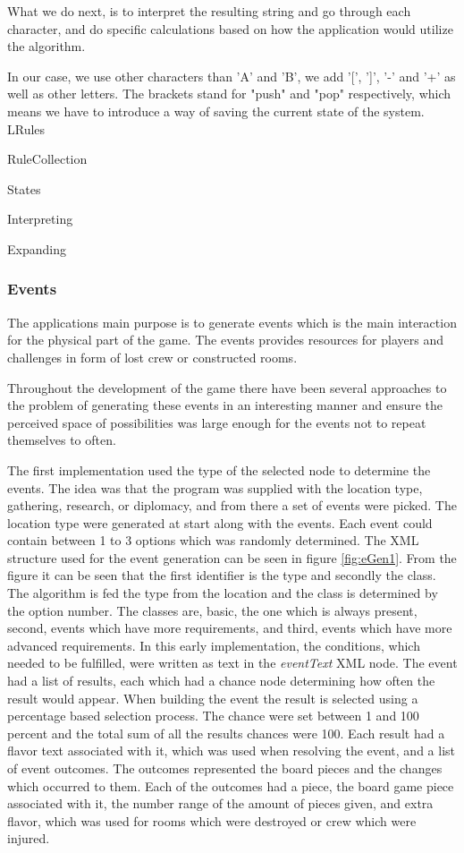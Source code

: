 What we do next, is to interpret the resulting string and go through each character, and do specific calculations based on how the application would utilize the algorithm.

In our case, we use other characters than 'A' and 'B', we add '[', ']', '-' and '+' as well as other letters. The brackets stand for "push" and "pop" respectively, which means we have to introduce a way of saving the current state of the system.\\


LRules

RuleCollection

States

Interpreting

Expanding
\subsubsection{Events}
The applications main purpose is to generate events which is the main interaction for the physical part of the game. The events provides resources for players and challenges in form of lost crew or constructed rooms.

Throughout the development of the game there have been several approaches to the problem of generating these events in an interesting manner and ensure the perceived space of possibilities was large enough for the events not to repeat themselves to often.

The first implementation used the type of the selected node to determine the events.
The idea was that the program was supplied with the location type, gathering, research, or diplomacy, and from there a set of events were picked. The location type were generated at start along with the events. 
Each event could contain between 1 to 3 options which was randomly determined.
The XML structure used for the event generation can be seen in figure \ref{fig:eGen1}.
From the figure it can be seen that the first identifier is the type and secondly the class. The algorithm is fed the type from the location and the class is determined by the option number. The classes are, basic, the one which is always present, second, events which have more requirements, and third, events which have more advanced requirements. 
In this early implementation, the conditions, which needed to be fulfilled, were written as text in the \textit{eventText} XML node. 
The event had a list of results, each which had a chance node determining how often the result would appear. When building the event the result is selected using a percentage based selection process. The chance were set between 1 and 100 percent and the total sum of all the results chances were 100. 
Each result had a flavor text associated with it, which was used when resolving the event, and a list of event outcomes. 
The outcomes represented the board pieces and the changes which occurred to them. Each of the outcomes had a piece, the board game piece associated with it, the number range of the amount of pieces given, and extra flavor, which was used for rooms which were destroyed or crew which were injured.


